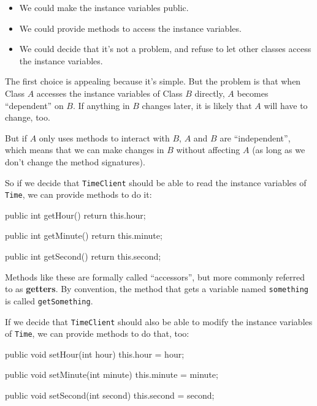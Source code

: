 \documentclass[12pt]{book}
\theoremstyle{exercise}
\newcommand{\java}[1]{\verb"#1"}
\begin{document}
\begin{itemize}

\item We could make the instance variables public.

\item We could provide methods to access the instance variables.

\item We could decide that it's not a problem, and refuse to let other classes access the instance variables.

\end{itemize}

The first choice is appealing because it's simple.
But the problem is that when Class $A$ accesses the instance variables of Class $B$ directly, $A$ becomes ``dependent'' on $B$.
If anything in $B$ changes later, it is likely that $A$ will have to change, too.


But if $A$ only uses methods to interact with $B$, $A$ and $B$ are ``independent'', which means that we can make changes in $B$ without affecting $A$ (as long as we don't change the method signatures).

So if we decide that \java{TimeClient} should be able to read the instance variables of \java{Time}, we can provide methods to do it:

\begin{code}
    public int getHour() {
        return this.hour;
    }

    public int getMinute() {
        return this.minute;
    }

    public int getSecond() {
        return this.second;
    }
\end{code}


Methods like these are formally called ``accessors'', but more commonly referred to as {\bf getters}.
By convention, the method that gets a variable named \java{something} is called \java{getSomething}.

If we decide that \java{TimeClient} should also be able to modify the instance variables of \java{Time}, we can provide methods to do that, too:

\begin{code}
    public void setHour(int hour) {
        this.hour = hour;
    }

    public void setMinute(int minute) {
        this.minute = minute;
    }

    public void setSecond(int second) {
        this.second = second;
    }
\end{code}
\end{document}
